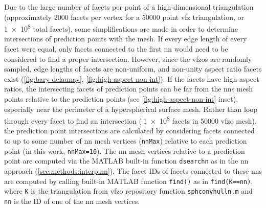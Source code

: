 \documentclass[final,twocolumn,12pt]{elsarticle}
\newcommand{\outpt}{prediction}
\newcommand{\vfzorepo}{\gls{vfzo} repository}
\begin{document}
{\begin{appendices}
Due to the large number of facets per point of a high-dimensional triangulation (approximately \num{2000} facets per vertex for a \num{50000} point \gls{vfz} triangulation, or \num{1e8} total facets), some simplifications are made in order to determine intersections of \outpt{} points with the mesh. If every edge length of every facet were equal, only facets connected to the first \gls{nn} would need to be considered to find a proper intersection. However, since the \glspl{vfzo} are randomly sampled, edge lengths of facets are non-uniform, and non-unity aspect ratio facets exist (\cref{fig:bary-delaunay}, \cref{fig:high-aspect-non-int}). If the facets have high-aspect ratios, the intersecting facets of \outpt{} points can be far from the \glspl{nn} mesh points relative to the \outpt{} points (see \cref{fig:high-aspect-non-int} inset), especially near the perimeter of a hyperspherical surface mesh. Rather than loop through every facet to find an intersection ($~$\num{1e8} facets in \num{50000} \gls{vfzo} mesh), the \outpt{} point intersections are calculated by considering facets connected to up to some number of \gls{nn} mesh vertices (\texttt{nnMax}) relative to each \outpt{} point (in this work, \texttt{nnMax=10}). The \gls{nn} mesh vertices relative to a \outpt{} point are computed via the MATLAB built-in function \texttt{dsearchn} as in the \gls{nn} approach (\cref{sec:methods:interp:nn}). The facet IDs of facets connected to these \glspl{nn} are computed by calling built-in MATLAB function \texttt{find()} as in \texttt{find(K==nn)}, where \texttt{K} is the triangulation from \vfzorepo{} function \texttt{sphconvhulln.m} and \texttt{nn} is the ID of one of the \gls{nn} mesh vertices. 


\end{appendices}}
\end{document}
